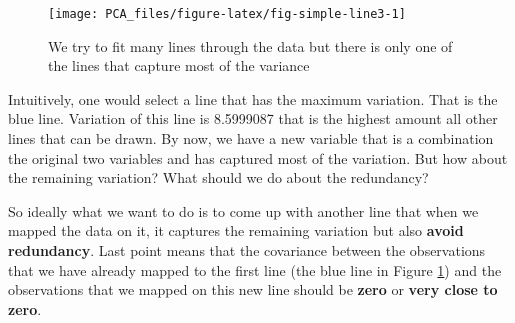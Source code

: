 \documentclass[
]{book}
\newenvironment{Shaded}{\begin{snugshade}}{\end{snugshade}}
\newcommand{\CommentTok}[1]{\textcolor[rgb]{0.56,0.35,0.01}{\textit{#1}}}
\newcommand{\DataTypeTok}[1]{\textcolor[rgb]{0.13,0.29,0.53}{#1}}
\newcommand{\DecValTok}[1]{\textcolor[rgb]{0.00,0.00,0.81}{#1}}
\newcommand{\FloatTok}[1]{\textcolor[rgb]{0.00,0.00,0.81}{#1}}
\newcommand{\KeywordTok}[1]{\textcolor[rgb]{0.13,0.29,0.53}{\textbf{#1}}}
\newcommand{\NormalTok}[1]{#1}
\newcommand{\OperatorTok}[1]{\textcolor[rgb]{0.81,0.36,0.00}{\textbf{#1}}}
\newcommand{\OtherTok}[1]{\textcolor[rgb]{0.56,0.35,0.01}{#1}}
\newcommand{\StringTok}[1]{\textcolor[rgb]{0.31,0.60,0.02}{#1}}
\theoremstyle{definition}
\theoremstyle{definition}
\theoremstyle{definition}
\theoremstyle{remark}
\begin{document}
\begin{Shaded}
\end{Shaded}

\begin{figure}

{\centering \texttt{[image: PCA\_files/figure-latex/fig-simple-line3-1]} 

}

\caption{We try to fit many lines through the data but there is only one of the lines that capture most of the variance}\label{fig:fig-simple-line3}
\end{figure}

Intuitively, one would select a line that has the maximum variation. That is the blue line. Variation of this line is 8.5999087 that is the highest amount all other lines that can be drawn. By now, we have a new variable that is a combination the original two variables and has captured most of the variation. But how about the remaining variation? What should we do about the redundancy?

So ideally what we want to do is to come up with another line that when we mapped the data on it, it captures the remaining variation but also \textbf{avoid redundancy}. Last point means that the covariance between the observations that we have already mapped to the first line (the blue line in Figure \ref{fig:fig-simple-line3}) and the observations that we mapped on this new line should be \textbf{zero} or \textbf{very close to zero}.
\end{document}
